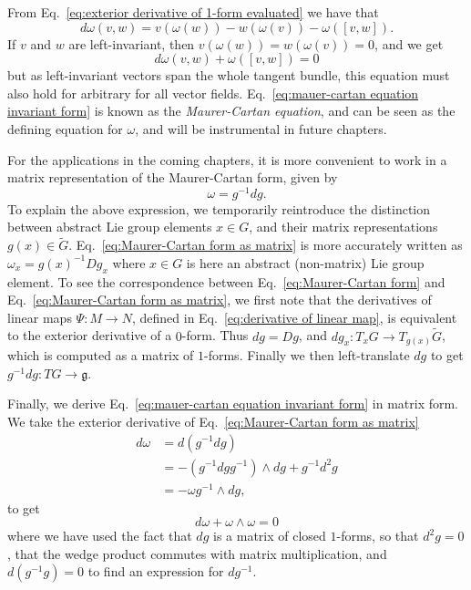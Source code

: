 From Eq.~\ref{eq:exterior derivative of 1-form evaluated} we have that
\begin{equation}
d \omega(v,w) = v(\omega(w)) - w(\omega(v)) - \omega([v,w]).
\end{equation}
If $v$ and $w$ are left-invariant, then $v(\omega(w)) = w(\omega(v)) = 0$, and we get
\begin{equation} \label{eq:mauer-cartan equation invariant form}
d \omega(v,w) + \omega([v,w]) = 0
\end{equation}
but as left-invariant vectors span the whole tangent bundle, this equation must also hold for arbitrary for all vector fields. Eq.~\ref{eq:mauer-cartan equation invariant form} is known as the \textit{Maurer-Cartan equation}, and can be seen as the defining equation for $\omega$, and will be instrumental in future chapters.

For the applications in the coming chapters, it is more convenient to work in a matrix representation of the Maurer-Cartan form, given by
\begin{equation} \label{eq:Maurer-Cartan form as matrix}
\omega = g^{-1} dg.
\end{equation}
To explain the above expression, we temporarily reintroduce the distinction between abstract Lie group elements $x \in G$, and their matrix representations $g(x) \in \tilde{G}$. Eq.~\ref{eq:Maurer-Cartan form as matrix} is more accurately written as $\omega_x = g(x)^{-1} Dg_x$ where $x \in G$ is here an abstract (non-matrix) Lie group element. To see the correspondence between Eq.~\ref{eq:Maurer-Cartan form} and Eq.~\ref{eq:Maurer-Cartan form as matrix}, we first note that the derivatives of linear maps $\Psi : M \to N$, defined in Eq.~\ref{eq:derivative of linear map}, is equivalent to the exterior derivative of a $0$-form. Thus $dg = Dg$, and $dg_x : T_x G \to T_{g(x)} \tilde{G}$, which is computed as a matrix of $1$-forms. Finally we then left-translate $dg$ to get $g^{-1} dg : TG \to \mathfrak{g}$.

Finally, we derive Eq.~\ref{eq:mauer-cartan equation invariant form} in matrix form. We take the exterior derivative of Eq.~\ref{eq:Maurer-Cartan form as matrix}
\begin{equation} \label{eq:Mauer-Cartan equation in matrix form}
\begin{aligned}
d \omega & = d(g^{-1} dg) \\
& = - (g^{-1} dg g^{-1}) \wedge dg + g^{-1} d^2 g \\
& = - \omega g^{-1} \wedge dg,
\end{aligned}
\end{equation}
to get
\begin{equation}
d \omega + \omega \wedge \omega = 0
\end{equation}
where we have used the fact that $dg$ is a matrix of closed $1$-forms, so that $d^2 g=0$, that the wedge product commutes with matrix multiplication, and $d(g^{-1} g) = 0$ to find an expression for $d g^{-1}$.

